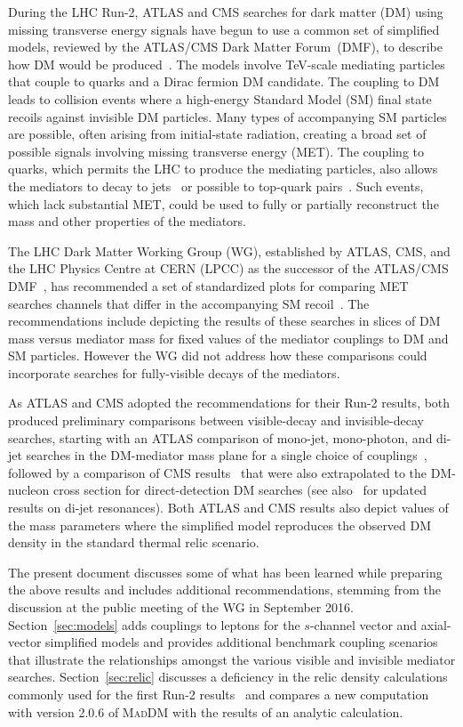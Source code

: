 \documentclass[a4paper, 11pt,notoc]{article}
\newcommand{\maddm}{\textsc{MadDM}\xspace}
\begin{document}
During the LHC Run-2, ATLAS and CMS searches for dark matter (DM) using missing transverse energy signals have begun to use a common set of simplified models, reviewed by the ATLAS/CMS Dark Matter Forum~(DMF), to describe how DM would be produced~\cite{Abercrombie:2015wmb}. The models involve TeV-scale mediating particles that couple to quarks and a Dirac fermion DM candidate. The coupling to DM leads to collision events where a high-energy Standard Model (SM) final state recoils against invisible DM particles. Many types of accompanying SM particles are possible, often arising from initial-state radiation, creating a broad set of possible signals involving missing transverse energy (MET). The coupling to quarks, which permits the LHC to produce the mediating particles, also allows the mediators to decay to jets~\cite{Dreiner:2013vla,Chala:2015ama,Fairbairn:2016iuf} or possible to top-quark pairs~\cite{Chala:2015ama,Aaboud:2017hnm,Bauer:2017ota}. Such events, which lack substantial MET, could be used to fully or partially reconstruct the mass and other properties of the mediators.

The LHC Dark Matter Working Group (WG), established by ATLAS, CMS, and the LHC Physics Centre at CERN (LPCC) as the successor of the ATLAS/CMS DMF~\cite{Abercrombie:2015wmb}, has recommended a set of standardized plots for comparing MET searches channels that differ in the accompanying SM recoil~\cite{Boveia:2016mrp}. The recommendations include depicting the results of these searches in slices of DM mass versus mediator mass for fixed values of the mediator couplings to DM and SM particles. However the WG did not address how these comparisons could incorporate searches for fully-visible decays of the mediators.

As ATLAS and CMS adopted the recommendations for their Run-2 results, both produced preliminary comparisons between visible-decay and invisible-decay searches, starting with an ATLAS comparison of mono-jet, mono-photon, and di-jet searches in the DM-mediator mass plane for a single choice of couplings~\cite{ATLASsummaryplots}, followed by a  comparison of CMS results~\cite{CMS_SummaryPlots_ICHEP} that were also extrapolated to the DM-nucleon cross section for direct-detection DM searches (see also~\cite{Sirunyan:2016iap} for updated results on di-jet resonances). Both ATLAS and CMS results also depict values of the mass parameters where the simplified model reproduces the observed DM density in the standard thermal relic scenario.

The present document discusses some of what has been learned while preparing the above results and includes additional recommendations, stemming from the discussion at the public meeting of the WG in September 2016. Section~\ref{sec:models} adds couplings to leptons for the $s$-channel vector and axial-vector simplified models and provides additional benchmark coupling scenarios that illustrate the relationships amongst the various visible and invisible mediator searches. Section~\ref{sec:relic} discusses a deficiency in the relic density calculations commonly used for the first Run-2 results~\cite{Boveia:2016mrp,ATLASsummaryplots,CMS_SummaryPlots_ICHEP} and compares a new computation with version 2.0.6 of \maddm with the results of an analytic calculation. 
\end{document}
